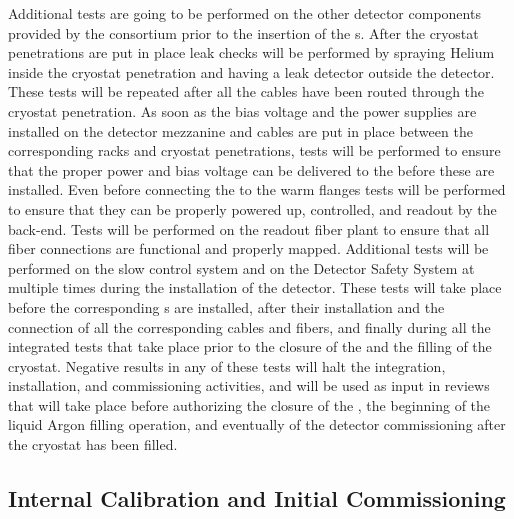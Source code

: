 Additional tests are going to be performed on the other detector components
provided by the  consortium prior to the insertion of the
s. After the cryostat penetrations are put in place leak checks
will be performed by spraying Helium inside the cryostat penetration and
having a leak detector outside the detector. These tests will be repeated 
after all the cables have been routed through the cryostat penetration.
As soon as the bias voltage and the power supplies are installed on the detector
mezzanine and cables are put in place between the corresponding racks and
cryostat penetrations, tests will be performed to ensure that the proper 
power and bias voltage can be delivered to the  before these
are installed. Even before connecting the  to the warm flanges
tests will be performed to ensure that they can be properly powered up, controlled,
and readout by the  back-end. Tests will be performed on the
readout fiber plant to ensure that all fiber connections are functional
and properly mapped. Additional tests will be performed on the slow control
system and on the Detector Safety System at multiple times during the
installation of the detector. These tests will take place before the
corresponding s are installed, after their installation and
the connection of all the corresponding cables and fibers, and finally
during all the integrated tests that take place prior to the closure of
the  and the filling of the cryostat. Negative results in any
of these tests will halt the integration, installation, and
commissioning activities, and will be used as input in reviews that will
take place before authorizing the closure of the , the beginning
of the liquid Argon filling operation, and eventually of the detector 
commissioning after the cryostat has been filled.

\subsection{Internal Calibration and Initial Commissioning}
\label{sec:fdsp-tpcelec-integration-calib}


